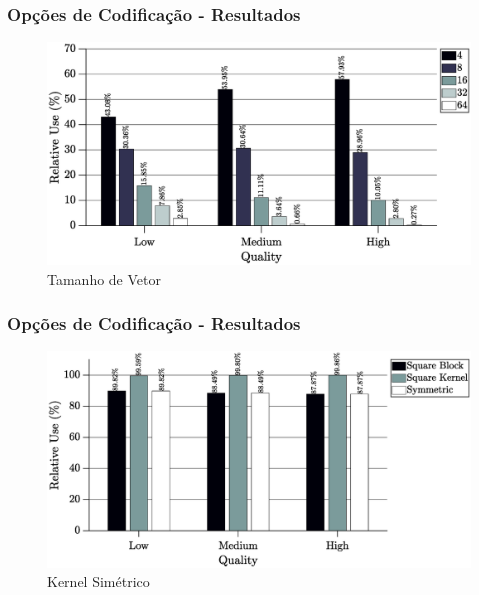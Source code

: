 \documentclass{beamer}
\begin{document}
\begin{frame}
       \frametitle{Opções de Codificação - Resultados}              
       \begin{center}
                     \begin{figure}[h]
                            \centering
                            \includegraphics[width=\textwidth]{Figures/vectSizAvg.eps}
                            \caption{Tamanho de Vetor}
                     \end{figure}
       \end{center}
\end{frame}

\begin{frame}
       \frametitle{Opções de Codificação - Resultados}              
       \begin{center}
                     \begin{figure}[h]
                            \centering
                            \includegraphics[width=\textwidth]{Figures/squareAvg.eps}
                            \caption{Kernel Simétrico}
                     \end{figure}
       \end{center}
\end{frame}
\end{document}
